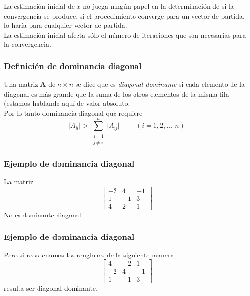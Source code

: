 \begin{frame}
La estimación inicial de $x$ no juega ningún papel en la determinación de si la convergencia se produce, si el procedimiento converge para un vector de partida, lo haría para cualquier vector de partida. 
\\
\bigskip
La estimación inicial afecta sólo el número de iteraciones que son necesarias para la convergencia.
\end{frame}
\begin{frame}
\frametitle{Definición de dominancia diagonal}
Una matriz $\mathbf{A}$ de $n \times n$ se dice que es \emph{diagonal dominante} si cada elemento de la diagonal es más grande que la suma de los otros elementos de la misma fila (estamos hablando aquí de valor absoluto.
\\
\medskip
Por lo tanto dominancia diagonal que requiere
\[ \vert A_{ii} \vert > \sum_{\substack{j=1 \\ j \neq i}}^{n} \vert A_{ij} \vert \hspace{1cm} (i=1,2,\ldots,n) \]
\end{frame}
\begin{frame}
\frametitle{Ejemplo de dominancia diagonal}
La matriz
\[ \begin{bmatrix}
-2 & 4 & -1 \\
1 & -1 & 3 \\
4 & 2 & 1
\end{bmatrix}\]
No es dominante diagonal.
\end{frame}
\begin{frame}
\frametitle{Ejemplo de dominancia diagonal}
Pero si reordenamos los renglones de la siguiente manera
\[ \begin{bmatrix}
4 & -2 & 1 \\
-2 & 4 & -1 \\
1 & -1 & 3
\end{bmatrix}\]
resulta ser diagonal dominante.
\end{frame}
